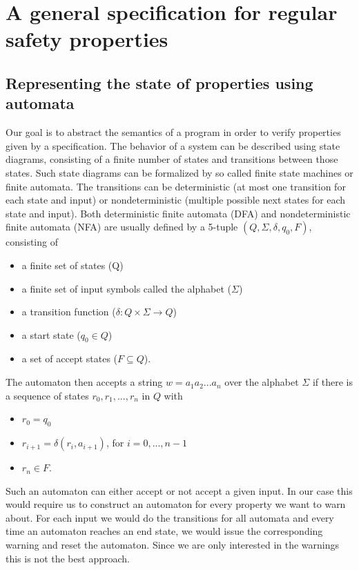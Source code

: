 

\chapter{A general specification for regular safety properties}

\section{Representing the state of properties using automata}
Our goal is to abstract the semantics of a program in order to verify properties given by a specification.
The behavior of a system can be described using state diagrams, consisting of a finite number of states and transitions between those states.
Such state diagrams can be formalized by so called finite state machines or finite automata.
The transitions can be deterministic (at most one transition for each state and input) or nondeterministic (multiple possible next states for each state and input).
Both deterministic finite automata (DFA) and nondeterministic finite automata (NFA) are usually defined by a 5-tuple $(Q, \Sigma, \delta, q_0, F)$, consisting of
\begin{itemize}
\item a finite set of states (Q)
\item a finite set of input symbols called the alphabet ($\Sigma$)
\item a transition function ($\delta : Q \times \Sigma \rightarrow Q$)
\item a start state ($q_0 \in Q$)
\item a set of accept states ($F \subseteq Q$).
\end{itemize}
The automaton then accepts a string $w = a_1 a_2 ... a_n$ over the alphabet $\Sigma$ if there is a sequence of states $r_0, r_1, ..., r_n$ in $Q$ with
\begin{itemize}
\item $r_0 = q_0$
\item $r_{i+1} = \delta(r_i, a_{i+1})$, for $i=0, ..., n-1$
\item $r_n \in F$.
\end{itemize}
Such an automaton can either accept or not accept a given input. In our case this would require us to construct an automaton for every property we want to warn about. For each input we would do the transitions for all automata and every time an automaton reaches an end state, we would issue the corresponding warning and reset the automaton. Since we are only interested in the warnings this is not the best approach.

